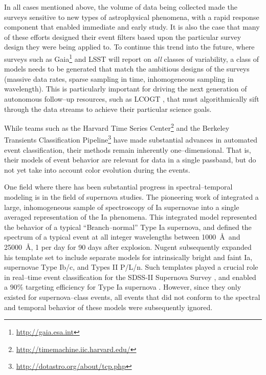 In all cases mentioned above, the volume of data being collected made the
surveys sensitive to new types of astrophysical phenomena, with a rapid response
component that enabled immediate and early study.  It is also the case that many
of these efforts designed their event filters based upon the particular survey
design they were being applied to.  To continue this trend into the future,
where surveys such as Gaia\footnote{\url{http://gaia.esa.int}} and LSST will
report on {\it all} classes of variability, a class of models needs to be
generated that match the ambitious designs of the surveys (massive data rates,
sparse sampling in time, inhomogeneous sampling in wavelength).  This is
particularly important for driving the next generation of autonomous follow--up
resources, such as LCOGT \citep{2008AN....329..269H}, that must algorithmically
sift through the data streams to achieve their particular science goals.

 \smallskip

While teams such as the Harvard Time Series
Center\footnote{\url{http://timemachine.iic.harvard.edu/}} and the Berkeley
Transients Classification
Pipeline\footnote{\url{http://dotastro.org/about/tcp.php}} have made substantial
advances in automated event classification, their methods remain inherently
one--dimensional. That is, their models of event behavior are relevant for data
in a single passband, but do not yet take into account color evolution during
the events.

One field where there has been substantial progress in spectral--temporal
modeling is in the field of supernova studies. The pioneering work of
\cite{2002PASP..114..803N} integrated a large, inhomogeneous sample of
spectroscopy of Ia supernovae into a single averaged representation of the Ia
phenomena. This integrated model represented the behavior of a typical
``Branch--normal'' Type Ia supernova, and defined the spectrum of a typical
event at all integer wavelengths between 1000~\AA~and 25000~\AA, 1 per day for
90 days after explosion.  Nugent subsequently expanded his template set to
include separate models for intrinsically bright and faint Ia, supernovae Type
Ib/c, and Types II P/L/n. Such templates played a crucial role in real--time
event classification for the SDSS-II Supernova Survey
\citep{2008AJ....135..338F}, and enabled a $90\%$ targeting efficiency for Type
Ia supernova \citep{2008AJ....135..348S}. However, since they only existed for
supernova--class events, all events that did not conform to the spectral and
temporal behavior of these models were subsequently ignored.

